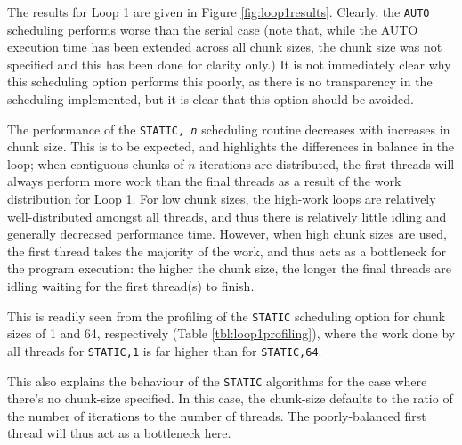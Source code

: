 \documentclass{article} %
\newcommand{\tp}{\texttt}
\begin{document}
The results for Loop 1 are given in Figure \ref{fig:loop1results}. Clearly, the \tp{AUTO} scheduling performs worse than the serial case (note that, while the AUTO execution time has been extended across all chunk sizes, the chunk size was not specified and this has been done for clarity only.)
It is not immediately clear why this scheduling option performs this poorly, as there is no transparency in the scheduling implemented, but it is clear that this option should be avoided.

The performance of the \tp{STATIC, \textit{n}} scheduling routine decreases with increases in chunk size.
This is to be expected, and highlights the differences in balance in the loop; when contiguous chunks of $n$ iterations are distributed, the first threads will always perform more work than the final threads as a result of the work distribution for Loop 1.
For low chunk sizes, the high-work loops are relatively well-distributed amongst all threads, and thus there is relatively little idling and generally decreased performance time.
However, when high chunk sizes are used, the first thread takes the majority of the work, and thus acts as a bottleneck for the program execution: the higher the chunk size, the longer the final threads are idling waiting for the first thread(s) to finish.

This is readily seen from the profiling of the \tp{STATIC} scheduling option for chunk sizes of 1 and 64, respectively (Table \ref{tbl:loop1profiling}), where the work done by all threads for \tp{STATIC,1} is far higher than for \tp{STATIC,64}.

This also explains the behaviour of the \tp{STATIC} algorithms for the case where there's no chunk-size specified.
In this case, the chunk-size defaults to the ratio of the number of iterations to the number of threads.
The poorly-balanced first thread will thus act as a bottleneck here.
\end{document}
